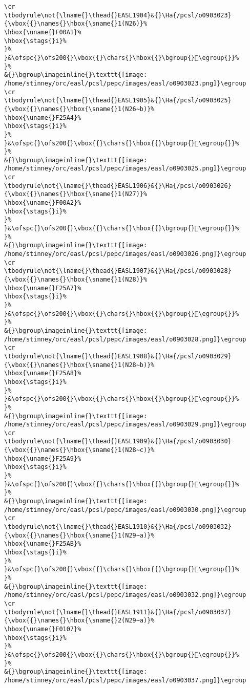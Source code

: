 \begin{verbatim}
\cr
\tbodyrule\not{\lname{}\thead{}EASL1904}&{}\Ha{/pcsl/o0903023}{\vbox{{}\names{}\hbox{\sname{}1(N26)}%
\hbox{\uname{}F00A1}%
\hbox{\stags{}i}%
}%
}&\ofspc{}\ofs200{}\vbox{{}\chars{}\hbox{{}\bgroup{}󰂡\egroup{}}%
}%
&{}\bgroup\imageinline{}\texttt{[image: /home/stinney/orc/easl/pcsl/pepc/images/easl/o0903023.png]}\egroup
\cr
\tbodyrule\not{\lname{}\thead{}EASL1905}&{}\Ha{/pcsl/o0903025}{\vbox{{}\names{}\hbox{\sname{}1(N26∼b)}%
\hbox{\uname{}F25A4}%
\hbox{\stags{}i}%
}%
}&\ofspc{}\ofs200{}\vbox{{}\chars{}\hbox{{}\bgroup{}󲖤\egroup{}}%
}%
&{}\bgroup\imageinline{}\texttt{[image: /home/stinney/orc/easl/pcsl/pepc/images/easl/o0903025.png]}\egroup
\cr
\tbodyrule\not{\lname{}\thead{}EASL1906}&{}\Ha{/pcsl/o0903026}{\vbox{{}\names{}\hbox{\sname{}1(N27)}%
\hbox{\uname{}F00A2}%
\hbox{\stags{}i}%
}%
}&\ofspc{}\ofs200{}\vbox{{}\chars{}\hbox{{}\bgroup{}󰂢\egroup{}}%
}%
&{}\bgroup\imageinline{}\texttt{[image: /home/stinney/orc/easl/pcsl/pepc/images/easl/o0903026.png]}\egroup
\cr
\tbodyrule\not{\lname{}\thead{}EASL1907}&{}\Ha{/pcsl/o0903028}{\vbox{{}\names{}\hbox{\sname{}1(N28)}%
\hbox{\uname{}F25A7}%
\hbox{\stags{}i}%
}%
}&\ofspc{}\ofs200{}\vbox{{}\chars{}\hbox{{}\bgroup{}󲖧\egroup{}}%
}%
&{}\bgroup\imageinline{}\texttt{[image: /home/stinney/orc/easl/pcsl/pepc/images/easl/o0903028.png]}\egroup
\cr
\tbodyrule\not{\lname{}\thead{}EASL1908}&{}\Ha{/pcsl/o0903029}{\vbox{{}\names{}\hbox{\sname{}1(N28∼b)}%
\hbox{\uname{}F25A8}%
\hbox{\stags{}i}%
}%
}&\ofspc{}\ofs200{}\vbox{{}\chars{}\hbox{{}\bgroup{}󲖨\egroup{}}%
}%
&{}\bgroup\imageinline{}\texttt{[image: /home/stinney/orc/easl/pcsl/pepc/images/easl/o0903029.png]}\egroup
\cr
\tbodyrule\not{\lname{}\thead{}EASL1909}&{}\Ha{/pcsl/o0903030}{\vbox{{}\names{}\hbox{\sname{}1(N28∼c)}%
\hbox{\uname{}F25A9}%
\hbox{\stags{}i}%
}%
}&\ofspc{}\ofs200{}\vbox{{}\chars{}\hbox{{}\bgroup{}󲖩\egroup{}}%
}%
&{}\bgroup\imageinline{}\texttt{[image: /home/stinney/orc/easl/pcsl/pepc/images/easl/o0903030.png]}\egroup
\cr
\tbodyrule\not{\lname{}\thead{}EASL1910}&{}\Ha{/pcsl/o0903032}{\vbox{{}\names{}\hbox{\sname{}1(N29∼a)}%
\hbox{\uname{}F25AB}%
\hbox{\stags{}i}%
}%
}&\ofspc{}\ofs200{}\vbox{{}\chars{}\hbox{{}\bgroup{}󲖫\egroup{}}%
}%
&{}\bgroup\imageinline{}\texttt{[image: /home/stinney/orc/easl/pcsl/pepc/images/easl/o0903032.png]}\egroup
\cr
\tbodyrule\not{\lname{}\thead{}EASL1911}&{}\Ha{/pcsl/o0903037}{\vbox{{}\names{}\hbox{\sname{}2(N29∼a)}%
\hbox{\uname{}F0107}%
\hbox{\stags{}i}%
}%
}&\ofspc{}\ofs200{}\vbox{{}\chars{}\hbox{{}\bgroup{}󰄇\egroup{}}%
}%
&{}\bgroup\imageinline{}\texttt{[image: /home/stinney/orc/easl/pcsl/pepc/images/easl/o0903037.png]}\egroup

\end{verbatim}
